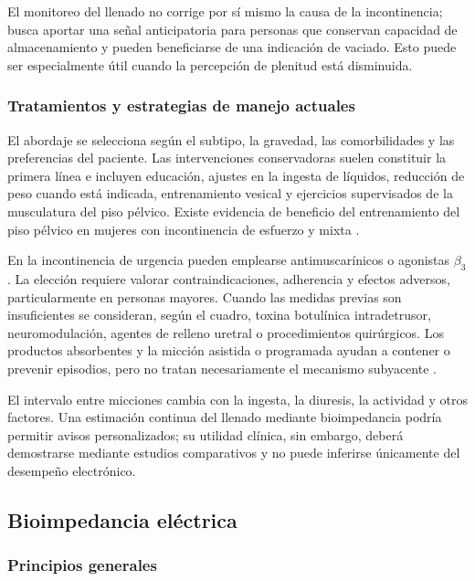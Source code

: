 \documentclass[12pt,a4paper]{article}
\begin{document}
El monitoreo del llenado no corrige por sí mismo la causa de la incontinencia; busca aportar una señal anticipatoria para personas que
conservan capacidad de almacenamiento y pueden beneficiarse de una indicación de vaciado. Esto puede
ser especialmente útil cuando la percepción de plenitud está disminuida.


\subsubsection{Tratamientos y estrategias de manejo actuales}

El abordaje se selecciona según el subtipo, la gravedad, las comorbilidades y las preferencias del
paciente. Las intervenciones conservadoras suelen constituir la primera línea e incluyen educación,
ajustes en la ingesta de líquidos, reducción de peso cuando está indicada, entrenamiento vesical y
ejercicios supervisados de la musculatura del piso pélvico. Existe evidencia de beneficio del
entrenamiento del piso pélvico en mujeres con incontinencia de esfuerzo y mixta
\cite{eau2025femaleLUTS,dumoulin2018pelvic}.

En la incontinencia de urgencia pueden emplearse antimuscarínicos o agonistas $\beta_3$. La elección
requiere valorar contraindicaciones, adherencia y efectos adversos, particularmente en personas mayores.
Cuando las medidas previas son insuficientes se consideran, según el cuadro, toxina botulínica
intradetrusor, neuromodulación, agentes de relleno uretral o procedimientos quirúrgicos. Los productos
absorbentes y la micción asistida o programada ayudan a contener o prevenir episodios, pero no tratan
necesariamente el mecanismo subyacente \cite{eau2025femaleLUTS}.

El intervalo entre micciones cambia con la ingesta, la diuresis, la actividad y
otros factores. Una estimación continua del llenado mediante bioimpedancia podría permitir avisos personalizados; su utilidad
clínica, sin embargo, deberá demostrarse mediante estudios comparativos y no puede inferirse únicamente
del desempeño electrónico.

\subsection{Bioimpedancia eléctrica}

\subsubsection{Principios generales}
\end{document}
